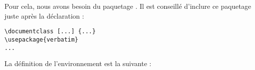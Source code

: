 Pour cela, nous avons besoin du paquetage . Il est conseillé d'inclure ce paquetage juste après la déclaration  :

{\singlespacing
\begin{verbatim}
\documentclass [...] {...}
\usepackage{verbatim}
...
\end{verbatim}
}

La définition de l'environnement  est la suivante :



